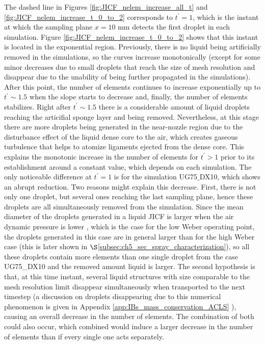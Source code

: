 The dashed line in Figures \ref{fig:JICF_nelem_increase_all_t} and  \ref{fig:JICF_nelem_increase_t_0_to_2} corresponds  to $t^{\prime} = 1$, which is the instant at which the sampling plane $x = 10$ mm detects the first droplet in each simulation. Figure \ref{fig:JICF_nelem_increase_t_0_to_2} shows that this instant is located in the exponential region. Previously, there is no liquid being artificially removed in the simulations, so the curves increase monotonically (except for some minor decreases due to small droplets that reach the size of mesh resolution and disappear due to the unability of being further propagated in the simulations). After this point, the number of elements continues to increase exponentially up to $t^{\prime} \sim 1.5$ when the slope starts to decrease and, finally, the number of elements  stabilizes. Right after $t^{\prime} \sim 1.5$ there is a considerable amount of liquid droplets reaching the articifial sponge layer and being removed. Nevertheless, at this stage there are more droplets being generated in the near-nozzle region due to the disturbance effect of the liquid dense core to the air, which creates gaseous turbulence that helps to atomize ligaments ejected from the dense core. This explains the monotonic increase in the number of elements for $t^{\prime} > 1$ prior to its establishment around a constant value, which depends on each simulation. The only noticeable difference at $t^{\prime} = 1$ is for the simulation UG75$\_$DX10, which shows an abrupt reduction. Two reasons might explain this decrease. First, there is not only one droplet, but several ones reaching the last sampling plane, hence these droplets are all simultaneously removed from the simulation. Since the mean diameter of the droplets generated in a liquid JICF is larger when the air dynamic pressure is lower , which is the case for the low Weber operating point, the droplets generated in this case are in general larger than for the high Weber case (this is later shown in $\S$\ref{subsec:ch5_sec_spray_characterization}), so all these droplets contain more elements than one single droplet from the case UG75\_DX10 and the removed amount liquid is larger. The second hypothesis is that, at this time instant, several liquid structures with size comparable to the mesh resolution limit disappear simultaneously when transported to the next timestep (a discussion on droplets disappearing due to this numerical phenomenon is given in Appendix \ref{app:IBs_mass_conservation_ACLS}
), causing an overall decrease in the number of elements. The combination of both could also occur, which combined would induce a larger decrease in the number of elements than if every single one acts separately.


